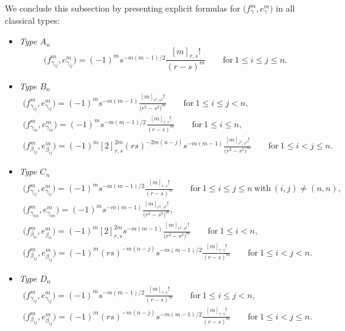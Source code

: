 \documentclass[10pt,a4paper]{amsart}
\numberwithin{equation}{section}
\begin{document}
We conclude this subsection by presenting explicit formulas for $\bigl(f_{\gamma}^{m},e_{\gamma}^{m}\bigr)$ in all classical types:
\begin{itemize}\itemsep=0pt
\item
\emph{Type $A_{n}$}
\begin{equation}\label{eq:A-parity-constants}
 \bigl(f_{\gamma_{ij}}^{m},e_{\gamma_{ij}}^{m}\bigr) = (-1)^{m}s^{-m(m-1)/2}\frac{[m]_{r,s}!}{(r - s)^{m}}
 \qquad \mathrm{for} \ 1 \le i \le j \le n.
\end{equation}

\item
\emph{Type $B_{n}$}
\begin{gather}
 \bigl(f_{\gamma_{ij}}^{m},e_{\gamma_{ij}}^{m}\bigr) = (-1)^{m}s^{-m(m - 1)}\frac{[m]_{r^{2},s^{2}}!}{\bigl(r^{2} - s^{2}\bigr)^{m}}
 \qquad \mathrm{for} \ 1 \le i \le j < n, \nonumber\\
 \bigl(f_{\gamma_{in}}^{m},e_{\gamma_{in}}^{m}\bigr) = (-1)^{m}s^{-m(m-1)/2}\frac{[m]_{r,s}!}{(r - s)^{m}}
 \qquad \mathrm{for} \ 1 \le i \le n,\label{eq:B-parity-constants}\\
 \bigl(f_{\beta_{ij}}^{m},e_{\beta_{ij}}^{m}\bigr) =
 (-1)^{m}[2]_{r,s}^{2m}(rs)^{-2m(n - j)}s^{-m(m - 1)}\frac{[m]_{r^{2},s^{2}}!}{\bigl(r^{2} - s^{2}\bigr)^{m}}
 \qquad \mathrm{for} \ 1 \le i < j \le n.\nonumber
\end{gather}

\item
\emph{Type $C_{n}$}
\begin{gather}
 \bigl(f_{\gamma_{ij}}^{m},e_{\gamma_{ij}}^{m}\bigr) = (-1)^{m}s^{-m(m - 1)/2}\frac{[m]_{r,s}!}{(r - s)^{m}}
 \qquad \mathrm{for} \ 1 \le i \le j \le n \ \mathrm{with} \ (i,j) \neq (n,n),\nonumber \\
 \bigl(f_{\gamma_{nn}}^{m},e_{\gamma_{nn}}^{m}\bigr) = (-1)^{m}s^{-m(m - 1)}\frac{[m]_{r^{2},s^{2}}!}{\bigl(r^{2} - s^{2}\bigr)^{m}},\nonumber \\
 \bigl(f_{\beta_{ii}}^{m},e_{\beta_{ii}}^{m}\bigr) =
 (-1)^{m}[2]_{r,s}^{2m}s^{-m(m - 1)}\frac{[m]_{r^{2},s^{2}}!}{\bigl(r^{2} - s^{2}\bigr)^{m}}
 \qquad \mathrm{for} \ 1 \le i < n,\nonumber\\
 \bigl(f_{\beta_{ij}}^{m},e_{\beta_{ij}}^{m}\bigr) = (-1)^{m}(rs)^{-m(n - j)}s^{-m(m - 1)/2}\frac{[m]_{r,s}!}{(r - s)^{m}}
 \qquad \mathrm{for} \ 1 \le i < j < n.\label{eq:C-parity-constants}
\end{gather}

\item
\emph{Type $D_{n}$}
\begin{gather}
 \bigl(f_{\gamma_{ij}}^{m},e_{\gamma_{ij}}^{m}\bigr) = (-1)^{m}s^{-m(m - 1)/2}\frac{[m]_{r,s}!}{(r - s)^{m}}
 \qquad \mathrm{for} \ 1 \le i \le j < n, \nonumber\\
 \bigl(f_{\beta_{ij}}^{m},e_{\beta_{ij}}^{m}\bigr) = (-1)^{m}(rs)^{-m(n - j)}s^{-m(m - 1)/2}\frac{[m]_{r,s}!}{(r - s)^{m}}
 \qquad \mathrm{for} \ 1 \le i < j \le n.\label{eq:D-parity-constants}
\end{gather}
\end{itemize}
\end{document}
